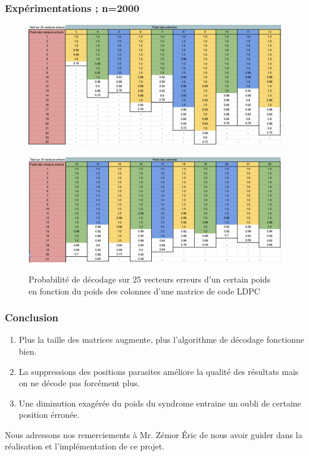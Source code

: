 \documentclass{beamer}
\begin{document}
    \begin{frame}
        \frametitle{Expérimentations ; n=2000}
        \begin{figure}[h!]
            \centering
            \includegraphics[scale=0.35]{res2000_1.png}
            \label{fig:res5}
        \end{figure}
        \begin{figure}[h!]
            \centering
            \includegraphics[scale=0.35]{res2000_2.png}
            \label{fig:res6}
            \caption{Probabilité de décodage sur 25 vecteurs erreurs d'un certain poids en fonction du poids des colonnes d'une matrice de code LDPC}
        \end{figure}
    \end{frame}

    \begin{frame}
        \frametitle{Conclusion}
        \begin{enumerate}
            \item Plus la taille des matrices augmente, plus l'algorithme de décodage fonctionne bien.
            \item La suppressions des positions parasites améliore la qualité des résultats mais on ne décode pas forcément plus.
            \item Une diminution exagérée du poids du syndrome entraine un oubli de certaine position érronée.
        \end{enumerate}
        \vspace{1cm}
        Nous adressons nos remerciements à Mr. Zémor Éric de nous avoir guider dans la réalisation et l'implémentation de ce projet.

    \end{frame}
\end{document}
